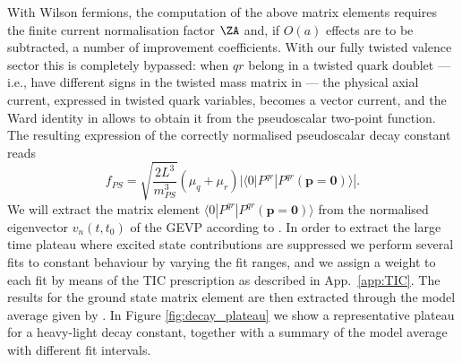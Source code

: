 With Wilson fermions, the computation of the above matrix elements requires the finite current
normalisation factor $\ZA$ and, if $O(a)$ effects are to be subtracted, a number of improvement
coefficients. With our fully twisted valence sector this is completely bypassed: when $qr$ belong
in a twisted quark doublet --- i.e., have different signs in the twisted mass matrix in  ---
the physical axial current, expressed in twisted quark variables, becomes a vector current,
and the Ward identity in  allows to obtain it from the pseudoscalar
two-point function.
The resulting expression of the correctly normalised pseudoscalar decay constant reads
\begin{equation}
	f_{PS} = \sqrt{\frac{2L^3}{m_{PS}^3}} (\mu_q+\mu_r) | \langle 0 | P^{qr} | P^{qr}(\mathbf{p=0})\rangle |
	\label{eq:renormalised_decay_constant}.
\end{equation}
We will extract the matrix element $ \langle 0 | P^{qr} | P^{qr}(\mathbf{p=0})\rangle $  from the 
normalised eigenvector $v_n(t,t_0)$ of the GEVP  according to . In 
order to extract the large time plateau where excited state contributions are suppressed we perform 
several fits to constant behaviour by varying the fit ranges,
and we assign a weight to each fit by means of the TIC prescription as
described in App.~\ref{app:TIC}. The results  for the ground state 
matrix element are then extracted through the model average given by .
In Figure  \ref{fig:decay_plateau} we show a representative plateau for a heavy-light decay constant, 
together with a summary of the model average with different fit intervals.


